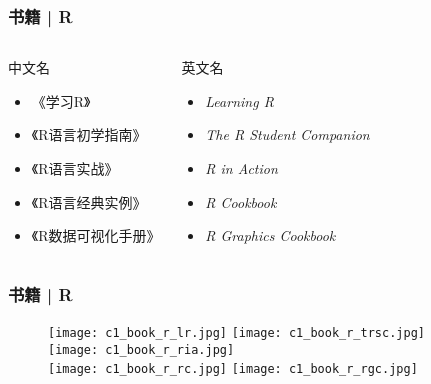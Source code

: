 \begin{frame}
  \frametitle{书籍 | R}
  \begin{columns}
  \begin{block}{中文名}
    \begin{itemize}
      \item 《学习R》
      \item 《R语言初学指南》
      \item 《R语言实战》
      \item 《R语言经典实例》
      \item 《R数据可视化手册》
    \end{itemize}
  \end{block}
  \begin{block}{英文名}
    \begin{itemize}
      \item \textit{Learning R}
      \item \textit{The R Student Companion}
      \item \textit{R in Action}
      \item \textit{R Cookbook}
      \item \textit{R Graphics Cookbook}
    \end{itemize}
  \end{block}
\end{columns}
\end{frame}

\begin{frame}
  \frametitle{书籍 | R}
  \begin{figure}
    \centering
    \texttt{[image: c1\_book\_r\_lr.jpg]}\qquad
    \texttt{[image: c1\_book\_r\_trsc.jpg]}\qquad
    \texttt{[image: c1\_book\_r\_ria.jpg]}\\
    \texttt{[image: c1\_book\_r\_rc.jpg]}\qquad
    \texttt{[image: c1\_book\_r\_rgc.jpg]}
  \end{figure}
\end{frame}

